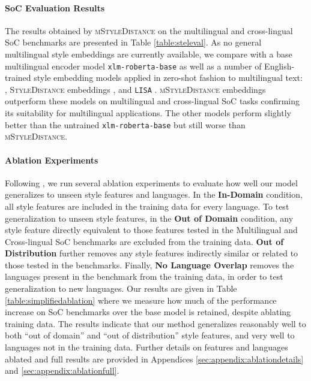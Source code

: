 \paragraph{SoC Evaluation Results}

The results obtained by \textsc{mStyleDistance} on the multilingual and cross-lingual SoC benchmarks are presented in Table \ref{table:steleval}. As no general multilingual style embeddings are currently available, we compare with a base multilingual encoder model \texttt{xlm-roberta-base} \citep{Conneau2019UnsupervisedCR} as well as a number of English-trained style embedding models applied in zero-shot fashion to multilingual text: \citet{styleemb}, \textsc{StyleDistance} embeddings \citep{patel2024styledistancestrongercontentindependentstyle}, and \texttt{LISA} \citep{lisa}. 
\textsc{mStyleDistance} embeddings outperform these models on multilingual and cross-lingual SoC tasks confirming its suitability for multilingual applications. The other models perform slightly better than the untrained \texttt{xlm-roberta-base} but still worse than \textsc{mStyleDistance}. 

\paragraph{Ablation Experiments}

\ablationsimpletable

Following \citep{patel2024styledistancestrongercontentindependentstyle}, we run several ablation experiments to evaluate how well our model generalizes to unseen style features and languages. In the \textbf{In-Domain} condition, all style features are included in the training data for every language. To test generalization to unseen style features, in the \textbf{Out of Domain} condition, any style feature directly equivalent to those features tested in the Multilingual and Cross-lingual SoC  benchmarks are excluded from the training data. \textbf{Out of Distribution} further removes any style features indirectly similar or related to those tested in the benchmarks. Finally, \textbf{No Language Overlap} removes the languages present in the benchmark from the training data, in order to test generalization to new languages. Our results are given in Table \ref{table:simplifiedablation} where we measure how much of the performance increase on SoC benchmarks over the base model is retained, despite ablating training data. The results indicate that our method generalizes reasonably well to both ``out of domain'' and ``out of distribution'' style features, and very well to languages not in the training data. Further details on features and languages ablated and full results are provided in Appendices  \ref{sec:appendix:ablationdetails} and \ref{sec:appendix:ablationfull}.

